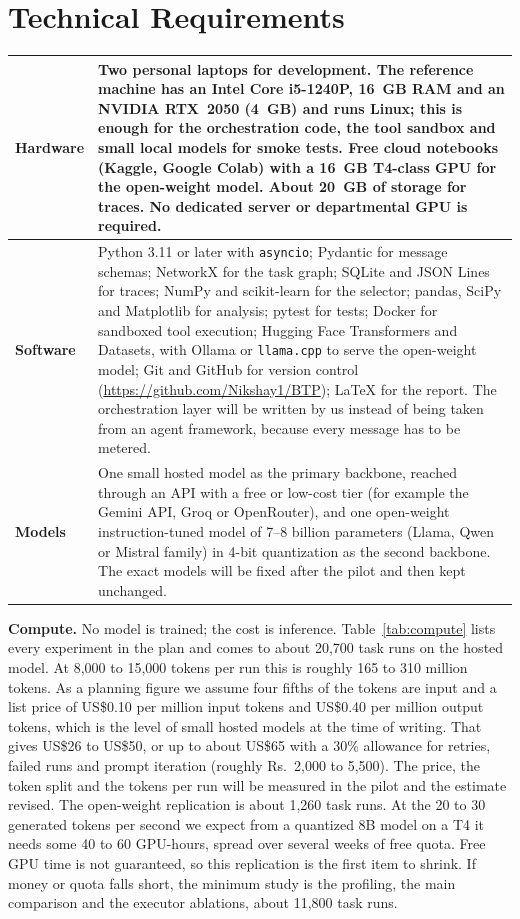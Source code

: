 \documentclass[11pt,a4paper]{article}
\newcommand{\head}[1]{\textbf{#1}}
\newcommand{\runin}[1]{\textbf{#1}\quad}
\begin{document}
\section{Technical Requirements}

\begin{table}[h]
\centering\small
\begin{tabularx}{\textwidth}{@{}P{2.3cm}L@{}}
\toprule
\head{Hardware} &
Two personal laptops for development. The reference machine has an Intel Core i5-1240P, 16~GB RAM and an
NVIDIA RTX~2050 (4~GB) and runs Linux; this is enough for the orchestration code, the tool sandbox and
small local models for smoke tests. Free cloud notebooks (Kaggle, Google Colab) with a 16~GB T4-class GPU
for the open-weight model. About 20~GB of storage for traces. No dedicated server or departmental GPU is
required. \\
\midrule
\head{Software} &
Python 3.11 or later with \texttt{asyncio}; Pydantic for message schemas; NetworkX for the task graph;
SQLite and JSON Lines for traces; NumPy and scikit-learn for the selector; pandas, SciPy and Matplotlib for
analysis; pytest for tests; Docker for sandboxed tool execution; Hugging Face Transformers and Datasets,
with Ollama or \texttt{llama.cpp} to serve the open-weight model; Git and GitHub for version control
(\url{https://github.com/Nikshay1/BTP}); \LaTeX{} for the report. The orchestration layer will be written
by us instead of being taken from an agent framework, because every message has to be metered. \\
\midrule
\head{Models} &
One small hosted model as the primary backbone, reached through an API with a free or low-cost tier (for
example the Gemini API, Groq or OpenRouter), and one open-weight instruction-tuned model of 7--8 billion
parameters (Llama, Qwen or Mistral family) in 4-bit quantization as the second backbone. The exact models
will be fixed after the pilot and then kept unchanged. \\
\bottomrule
\end{tabularx}
\end{table}

\runin{Compute.}
No model is trained; the cost is inference. Table~\ref{tab:compute} lists every experiment in the plan and
comes to about 20,700 task runs on the hosted model. At 8,000 to 15,000 tokens per run this is roughly 165
to 310 million tokens. As a planning figure we assume four fifths of the tokens are input and a list price
of US\$0.10 per million input tokens and US\$0.40 per million output tokens, which is the level of small
hosted models at the time of writing. That gives US\$26 to US\$50, or up to about US\$65 with a 30\%
allowance for retries, failed runs and prompt iteration (roughly Rs.~2,000 to 5,500). The price, the token
split and the tokens per run will be measured in the pilot and the estimate revised. The open-weight
replication is about 1,260 task runs. At the 20 to 30 generated tokens per second we expect from a
quantized 8B model on a T4 it needs some 40 to 60 GPU-hours, spread over several weeks of free quota. Free
GPU time is not guaranteed, so this replication is the first item to shrink. If money or quota falls
short, the minimum study is the profiling, the main comparison and the executor ablations, about 11,800
task runs.
\end{document}
